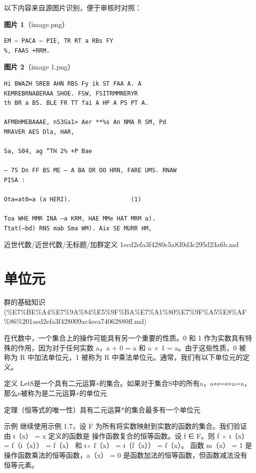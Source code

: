 \begin{note}
以下内容来自源图片识别，便于审核时对照：

\textbf{图片 1}（image.png）
\begin{Verbatim}[fontsize=\small]
EM — PACA — PIE, TR RT a RBs FY
%, FAAS +RRM.
\end{Verbatim}

\textbf{图片 2}（image 1.png）
\begin{Verbatim}[fontsize=\small]
Hi BWAZH SREB AHN RBS Fy ik ST FAA A. A
KEMREBRNABERAA SHOE. FSW, FSITRMMNERYR
th BR a BS. BLE FR TT fai A HP A PS PT A.

AFMBHMEBAAAE, nS3Ga1> Aer **%s An NMA R SM, Pd
MRAVER AES Dla, HAR,

Sa, S04, ag “TH 2% +P Bae

— 7S Dn FF BS ME — A BA OR OO HRN, FARE UMS. RNAW
PISA :

Ota=at0=a (a HERI).                 (1)

Toa WHE MMR INA —a KRM, HAE MMe HAT MRM a).
Ttat(—bd) RNS mab Sma WM). Aix SE MURR HM,
\end{Verbatim}

\end{note}

\begin{note}[来源路径]

近世代数/近世代数/无标题/加群定义 1ecd2efa3f4280c5a839d3c295d23a6b.md

\end{note}

\section*{单位元}

\begin{note}[来源上级主题]

群的基础知识 (\%E7\%BE\%A4\%E7\%9A\%84\%E5\%9F\%BA\%E7\%A1\%80\%E7\%9F\%A5\%E8\%AF\%86\%201aed2efa3f428009ac4eca74062880ff.md)

\end{note}

\begin{note}[单位元]

在代数中，一个集合上的操作可能具有另一个重要的性质。0 和 1 作为实数具有特殊的作用，因为对于任何实数 a，a + 0 = a 和 a × 1 = a。由于这些性质，0 被称为 R 中加法单位元，1 被称为 R 中乘法单位元。通常，我们有以下单位元的定义。

定义 LetS是一个具有二元运算∗的集合。如果对于集合S中的所有a，a∗e=e∗a=a，那么e被称为是二元运算∗的单位元

定理（恒等式的唯一性）具有二元运算*的集合最多有一个单位元

示例 继续使用示例 1.7，设 F 为所有将实数映射到实数的函数的集合。我们验证由 ι（x） = x 定义的函数是 操作函数复合的恒等函数。设 f ∈ F。则 f ◦ ι（x） = f（ι（x）） = f（x） 和 ι◦ f（x） = ι（f（x）） = f（x）。 函数 m（x） = 1 是操作函数乘法的恒等函数，a（x） = 0 是函数加法的恒等函数，但函数减法没有恒等元素。

\end{note}

